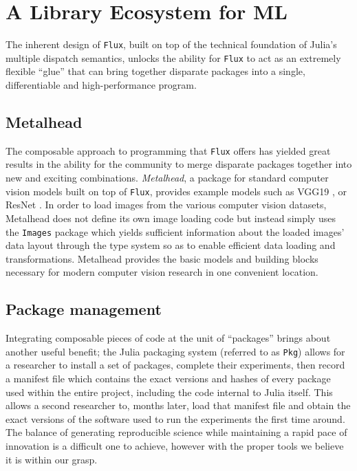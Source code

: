 \documentclass{juliacon}
\begin{document}
\section{A Library Ecosystem for ML}

The inherent design of \texttt{Flux}, built on top of the technical foundation of Julia's multiple dispatch semantics, unlocks the ability for \texttt{Flux} to act as an extremely flexible ``glue'' that can bring together disparate packages into a single, differentiable and high-performance program.

\subsection{Metalhead}
The composable approach to programming that \texttt{Flux} offers has yielded great results in the ability for the community to merge disparate packages together into new and exciting combinations.  \textit{Metalhead}, a package for standard computer vision models built on top of \texttt{Flux}, provides example models such as VGG19 \cite{vgg19}, or ResNet \cite{resnet}.  In order to load images from the various computer vision datasets, Metalhead does not define its own image loading code but instead simply uses the \texttt{Images} package which yields sufficient information about the loaded images' data layout through the type system so as to enable efficient data loading and transformations.  Metalhead provides the basic models and building blocks necessary for modern computer vision research in one convenient location.

\subsection{Package management}
Integrating composable pieces of code at the unit of ``packages'' brings about another useful benefit; the Julia packaging system (referred to as \texttt{Pkg}) allows for a researcher to install a set of packages, complete their experiments, then record a manifest file which contains the exact versions and hashes of every package used within the entire project, including the code internal to Julia itself.  This allows a second researcher to, months later, load that manifest file and obtain the exact versions of the software used to run the experiments the first time around.  The balance of generating reproducible science while maintaining a rapid pace of innovation is a difficult one to achieve, however with the proper tools we believe it is within our grasp.
\end{document}
